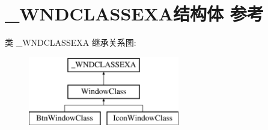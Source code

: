 \hypertarget{struct___w_n_d_c_l_a_s_s_e_x_a}{}\section{\+\_\+\+W\+N\+D\+C\+L\+A\+S\+S\+E\+X\+A结构体 参考}
\label{struct___w_n_d_c_l_a_s_s_e_x_a}
类 \+\_\+\+W\+N\+D\+C\+L\+A\+S\+S\+E\+XA 继承关系图\+:\begin{figure}[H]
\begin{center}
\leavevmode
\includegraphics[height=3.000000cm]{struct___w_n_d_c_l_a_s_s_e_x_a}
\end{center}
\end{figure}

